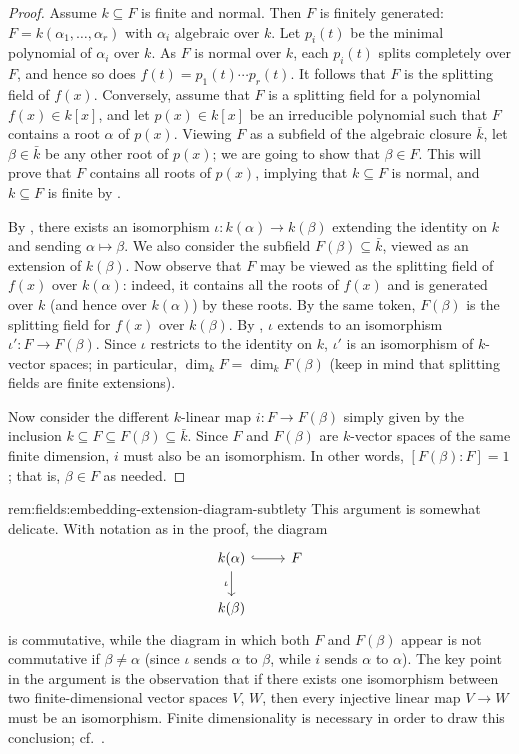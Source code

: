 \begin{proof}
  Assume $k \subseteq F$ is finite and normal. Then $F$ is finitely
  generated: $F = k(\alpha_1, \dots, \alpha_r)$ with $\alpha_i$
  algebraic over $k$. Let $p_i(t)$ be the minimal polynomial of
  $\alpha_i$ over $k$.  As $F$ is normal over $k$, each $p_i(t)$
  splits completely over $F$, and hence so does
  $f(t) = p_1(t) \cdots p_r(t)$. It follows that $F$ is the splitting
  field of $f(x)$.  Conversely, assume that $F$ is a splitting field
  for a polynomial $f(x) \in k[x]$, and let $p(x) \in k[x]$ be an
  irreducible polynomial such that $F$ contains a root $\alpha$ of
  $p(x)$. Viewing $F$ as a subfield of the algebraic closure
  $\bar{k}$, let $\beta \in \bar{k}$ be any other root of $p(x)$; we
  are going to show that $\beta \in F$. This will prove that $F$
  contains all roots of $p(x)$, implying that $k \subseteq F$ is
  normal, and $k \subseteq F$ is finite by .

  By , there exists an isomorphism
  $\iota : k(\alpha) \to k(\beta)$ extending the identity on $k$ and
  sending $\alpha \mapsto \beta$. We also consider the subfield
  $F(\beta) \subseteq \bar{k}$, viewed as an extension of
  $k(\beta)$. Now observe that $F$ may be viewed as the splitting
  field of $f(x)$ over $k(\alpha)$: indeed, it contains all the roots
  of $f(x)$ and is generated over $k$ (and hence over $k(\alpha)$) by
  these roots. By the same token, $F(\beta)$ is the splitting field
  for $f(x)$ over $k(\beta)$. By , $\iota$
  extends to an isomorphism $\iota' : F \to F(\beta)$. Since $\iota$
  restricts to the identity on $k$, $\iota'$ is an isomorphism of
  $k$-vector spaces; in particular, $\dim_k F = \dim_k F(\beta)$ (keep
  in mind that splitting fields are finite extensions).

  Now consider the different $k$-linear map $i : F \to F(\beta)$
  simply given by the inclusion
  $k \subseteq F \subseteq F(\beta) \subseteq \bar{k}$. Since $F$ and
  $F(\beta)$ are $k$-vector spaces of the same finite dimension, $i$
  must also be an isomorphism. In other words, $[F(\beta) : F] = 1$;
  that is, $\beta \in F$ as needed.
\end{proof}
\begin{rem}{}{rem:fields:embedding-extension-diagram-subtlety}
  This argument is somewhat delicate. With notation as in the proof,
  the diagram
  \[
    \begin{tikzcd}
      k(\alpha) \ar[r, hook] \ar[d, "\iota"'] & F \\
      k(\beta)
    \end{tikzcd}
  \]
  is commutative, while the diagram in which both $F$ and $F(\beta)$
  appear is not commutative if $\beta \neq \alpha$ (since $\iota$
  sends $\alpha$ to $\beta$, while $i$ sends $\alpha$ to
  $\alpha$). The key point in the argument is the observation that if
  there exists one isomorphism between two finite-dimensional vector
  spaces $V$, $W$, then every injective linear map $V \to W$ must be
  an isomorphism. Finite dimensionality is necessary in order to draw
  this conclusion; cf.\
  .
\end{rem}

